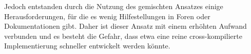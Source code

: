 Jedoch entstanden durch die Nutzung des gemischten Ansatzes einige Herausforderungen, für die es wenig Hilfestellungen in Foren oder Dokumentationen gibt. Daher ist dieser Ansatz mit einem erhöhten Aufwand verbunden und es besteht die Gefahr, dass etwa eine reine cross-kompilierte Implementierung schneller entwickelt werden könnte.